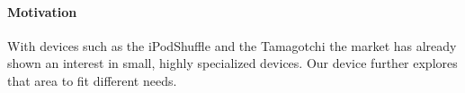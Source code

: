 \paragraph{Motivation}
With devices such as the iPod\registered Shuffle and the Tamagotchi\trademark 
the market has already shown an interest in small, highly specialized devices. 
Our device further explores that area to fit different needs.


